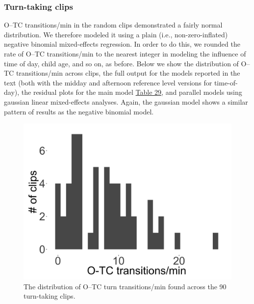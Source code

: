 \documentclass[floatsintext,man]{apa6}
\theoremstyle{definition}
\theoremstyle{definition}
\theoremstyle{definition}
\theoremstyle{remark}
\begin{document}
\newpage

\subsubsection{Turn-taking clips}\label{models-o_tc-turntaking}

O--TC transitions/min in the random clips demonstrated a fairly normal
distribution. We therefore modeled it using a plain (i.e.,
non-zero-inflated) negative binomial mixed-effects regression. In order
to do this, we rounded the rate of O--TC transitions/min to the nearest
integer in modeling the influence of time of day, child age, and so on,
as before. Below we show the distribution of O--TC transitions/min
across clips, the full output for the models reported in the text (both
with the midday and afternoon reference level versions for time-of-day),
the residual plots for the main model \protect\hyperlink{tab29}{Table
29}, and parallel models using gaussian linear mixed-effects analyses.
Again, the gaussian model shows a similar pattern of results as the
negative binomial model.

\begin{figure}

{\centering \includegraphics[width=0.4\linewidth]{www/o_c_tpm_turntaking_distribution} 

}

\caption{The distribution of O--TC turn transitions/min found across the 90 turn-taking clips.}\label{fig:fig22}
\end{figure}
\end{document}
